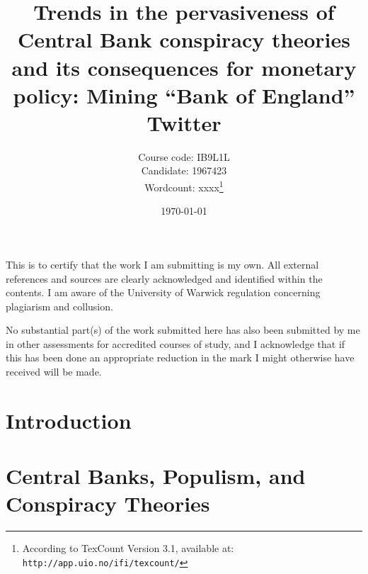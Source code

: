 \documentclass[11pt]{article}
\title{Trends in the pervasiveness of Central Bank conspiracy theories and its consequences for monetary policy: Mining ``Bank of England'' Twitter}
\author{Course code: IB9L1L\\
	    Candidate: 1967423\\
	    Wordcount: xxxx\footnote{According to TexCount Version 3.1, available at: \texttt{http://app.uio.no/ifi/texcount/}}}
\date{\today}
\begin{document}
\begin{titlepage}
	\centering
	\maketitle
{} 

\vspace{1in}

This is to certify that the work I am submitting is my own. All external references and sources are clearly acknowledged and identified within the contents. I am aware of the University of Warwick regulation concerning plagiarism and collusion.

No substantial part(s) of the work submitted here has also been submitted by me in other assessments for accredited courses of study, and I acknowledge that if this has been done an appropriate reduction in the mark I might otherwise have received will be made.
	
	\end{titlepage}
	
\section{Introduction} \label{Section: Introduction}

\section{Central Banks, Populism, and Conspiracy Theories} \label{Section: Central Banks, Populism, and Conspiracy Theories}
\end{document}
